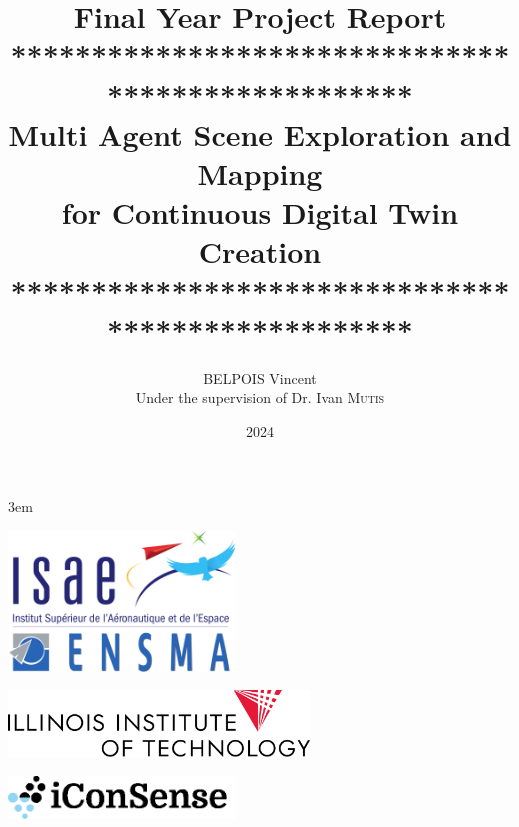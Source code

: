 \documentclass[12pt]{article}
\title{Final Year Project Report\vspace{10pt}\\
**************************************************\\
Multi Agent Scene Exploration and Mapping \\
for Continuous Digital Twin Creation\vspace{10pt}\\
**************************************************}
\author{BELPOIS Vincent \\ Under the supervision of Dr. Ivan \textsc{Mutis}}
\begin{document}
\emergencystretch 3em
\date{2024}
\maketitle
\thispagestyle{empty}

\vspace{10mm}

\begin{center}
\includegraphics[width = 6cm]{Images/logo_ensma.png}
\end{center}
\vspace{2cm}
\begin{center}
    \includegraphics[width = 8cm]{Images/IIT_Logo_stack_186_blk.png}
\end{center}
\vspace{1cm}
\begin{center}
    \includegraphics[width = 6cm]{Images/logo_iconsense_bloack_text.png}
\end{center}
\newpage
\thispagestyle{empty}
\mbox{}




\end{document}
